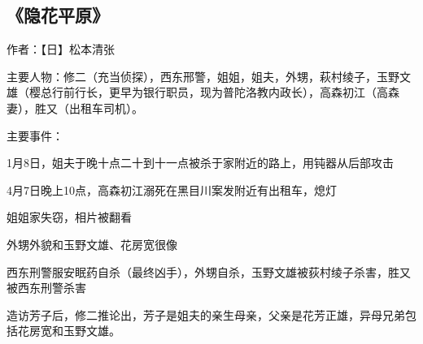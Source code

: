 \subsection{《隐花平原》}

作者：【日】松本清张

主要人物：修二（充当侦探），西东邢警，姐姐，姐夫，外甥，萩村绫子，玉野文雄（樱总行前行长，更早为银行职员，现为普陀洛教内政长），高森初江（高森妻），胜又（出租车司机）。

主要事件：
\begin{itemize*}
    \item 1月8日，姐夫于晚十点二十到十一点被杀于家附近的路上，用钝器从后部攻击
    \item 4月7日晚上10点，高森初江溺死在黑目川案发附近有出租车，熄灯
    \item 姐姐家失窃，相片被翻看
    \item 外甥外貌和玉野文雄、花房宽很像
    \item 西东刑警服安眠药自杀（最终凶手），外甥自杀，玉野文雄被荻村绫子杀害，胜又被西东刑警杀害
\end{itemize*}

造访芳子后，修二推论出，芳子是姐夫的亲生母亲，父亲是花芳正雄，异母兄弟包括花房宽和玉野文雄。
